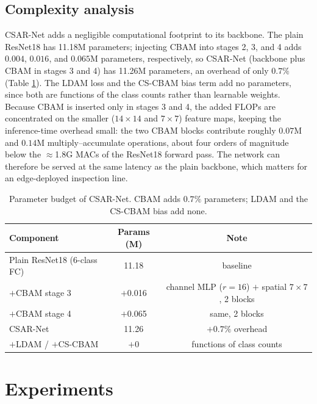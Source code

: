 \documentclass[a4paper,fleqn]{cas-sc}
\begin{document}
\begin{sloppypar}
	\subsection{Complexity analysis}
	\label{sec:complexity}
	\par{
		CSAR-Net adds a negligible computational footprint to its backbone. The plain ResNet18 has 11.18M parameters; injecting CBAM into stages 2, 3, and 4 adds $0.004$, $0.016$, and $0.065$M parameters, respectively, so CSAR-Net (backbone plus CBAM in stages 3 and 4) has 11.26M parameters, an overhead of only $0.7\%$ (Table \ref{tbl:complexity}). The LDAM loss and the CS-CBAM bias term add no parameters, since both are functions of the class counts rather than learnable weights. Because CBAM is inserted only in stages 3 and 4, the added FLOPs are concentrated on the smaller ($14\times14$ and $7\times7$) feature maps, keeping the inference-time overhead small: the two CBAM blocks contribute roughly $0.07$M and $0.14$M multiply--accumulate operations, about four orders of magnitude below the $\approx$1.8G MACs of the ResNet18 forward pass. The network can therefore be served at the same latency as the plain backbone, which matters for an edge-deployed inspection line.

		\begin{table}[pos=htbp]
			\footnotesize
			\caption{Parameter budget of CSAR-Net. CBAM adds $0.7\%$ parameters; LDAM and the CS-CBAM bias add none.}
			\label{tbl:complexity}
			\centering
			\begin{tabular}{lcc}
				\hline
				\textbf{Component} & \textbf{Params (M)} & \textbf{Note} \\ \hline
				Plain ResNet18 (6-class FC) & 11.18 & baseline \\
				$+$CBAM stage 3 & $+$0.016 & channel MLP ($r{=}16$) $+$ spatial $7{\times}7$, 2 blocks \\
				$+$CBAM stage 4 & $+$0.065 & same, 2 blocks \\
				CSAR-Net & 11.26 & $+0.7\%$ overhead \\
				$+$LDAM / $+$CS-CBAM & $+$0 & functions of class counts \\ \hline
			\end{tabular}
		\end{table}
	}

	\section{Experiments}
	\label{sec:exp}


\end{sloppypar}
\end{document}
